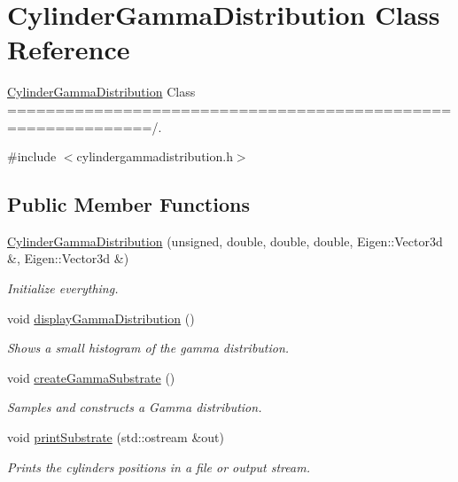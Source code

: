 \hypertarget{class_cylinder_gamma_distribution}{}\section{Cylinder\+Gamma\+Distribution Class Reference}
\label{class_cylinder_gamma_distribution}


\hyperlink{class_cylinder_gamma_distribution}{Cylinder\+Gamma\+Distribution} Class =============================================================/.  




{\ttfamily \#include $<$cylindergammadistribution.\+h$>$}

\subsection*{Public Member Functions}
\begin{DoxyCompactItemize}
\item 
\hyperlink{class_cylinder_gamma_distribution_a63bde146b07919742e432cf16c37e5a1}{Cylinder\+Gamma\+Distribution} (unsigned, double, double, double, Eigen\+::\+Vector3d \&, Eigen\+::\+Vector3d \&)
\begin{DoxyCompactList}\small\item\em Initialize everything. \end{DoxyCompactList}\item 
\mbox{\label{class_cylinder_gamma_distribution_a3408ed30966550c10810a0a6cbbfd3c2}} 
void \hyperlink{class_cylinder_gamma_distribution_a3408ed30966550c10810a0a6cbbfd3c2}{display\+Gamma\+Distribution} ()
\begin{DoxyCompactList}\small\item\em Shows a small histogram of the gamma distribution. \end{DoxyCompactList}\item 
\mbox{\label{class_cylinder_gamma_distribution_ad93e569b24e3c6b1266ecf79bd18dec9}} 
void \hyperlink{class_cylinder_gamma_distribution_ad93e569b24e3c6b1266ecf79bd18dec9}{create\+Gamma\+Substrate} ()
\begin{DoxyCompactList}\small\item\em Samples and constructs a Gamma distribution. \end{DoxyCompactList}\item 
void \hyperlink{class_cylinder_gamma_distribution_a2345c03be0b0c934efe02e4234c65fd1}{print\+Substrate} (std\+::ostream \&out)
\begin{DoxyCompactList}\small\item\em Prints the cylinders positions in a file or output stream. \end{DoxyCompactList}\end{DoxyCompactItemize}
